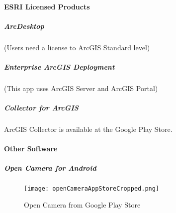 \paragraph{ESRI Licensed Products}
\subparagraph{ArcDesktop}

{\normalsize (Users need a license to ArcGIS Standard level)}
\subparagraph{Enterprise ArcGIS Deployment}

{\normalsize (This app uses ArcGIS Server and ArcGIS Portal)}
\subparagraph{Collector for ArcGIS}ArcGIS Collector is available at the Google Play Store.

\paragraph{Other Software}
\subparagraph{Open Camera for Android}
\begin{figure}[h!]
\centering
    \texttt{[image: openCameraAppStoreCropped.png]}
\caption{Open Camera from Google Play Store}
\end{figure}

